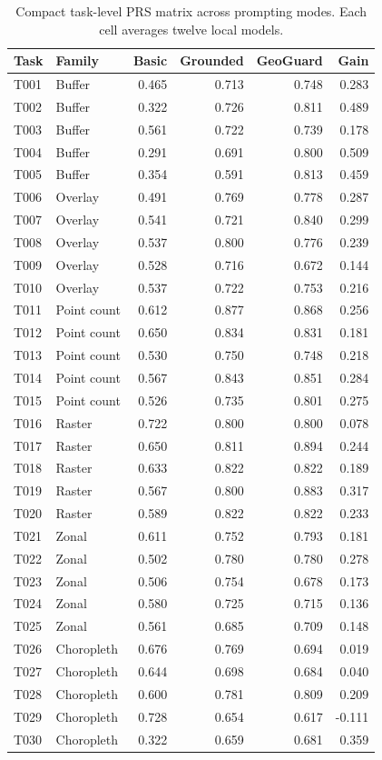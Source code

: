 \begin{table}[H]
\centering
\caption{Compact task-level PRS matrix across prompting modes. Each cell averages twelve local models.}
\label{tab:task-prs-matrix}
\small
\setlength{\tabcolsep}{4pt}
\begin{tabular}{llrrrr}
\toprule
Task & Family & Basic & Grounded & GeoGuard & Gain \\
\midrule
T001 & Buffer & 0.465 & 0.713 & 0.748 & 0.283 \\
T002 & Buffer & 0.322 & 0.726 & 0.811 & 0.489 \\
T003 & Buffer & 0.561 & 0.722 & 0.739 & 0.178 \\
T004 & Buffer & 0.291 & 0.691 & 0.800 & 0.509 \\
T005 & Buffer & 0.354 & 0.591 & 0.813 & 0.459 \\
T006 & Overlay & 0.491 & 0.769 & 0.778 & 0.287 \\
T007 & Overlay & 0.541 & 0.721 & 0.840 & 0.299 \\
T008 & Overlay & 0.537 & 0.800 & 0.776 & 0.239 \\
T009 & Overlay & 0.528 & 0.716 & 0.672 & 0.144 \\
T010 & Overlay & 0.537 & 0.722 & 0.753 & 0.216 \\
T011 & Point count & 0.612 & 0.877 & 0.868 & 0.256 \\
T012 & Point count & 0.650 & 0.834 & 0.831 & 0.181 \\
T013 & Point count & 0.530 & 0.750 & 0.748 & 0.218 \\
T014 & Point count & 0.567 & 0.843 & 0.851 & 0.284 \\
T015 & Point count & 0.526 & 0.735 & 0.801 & 0.275 \\
T016 & Raster & 0.722 & 0.800 & 0.800 & 0.078 \\
T017 & Raster & 0.650 & 0.811 & 0.894 & 0.244 \\
T018 & Raster & 0.633 & 0.822 & 0.822 & 0.189 \\
T019 & Raster & 0.567 & 0.800 & 0.883 & 0.317 \\
T020 & Raster & 0.589 & 0.822 & 0.822 & 0.233 \\
T021 & Zonal & 0.611 & 0.752 & 0.793 & 0.181 \\
T022 & Zonal & 0.502 & 0.780 & 0.780 & 0.278 \\
T023 & Zonal & 0.506 & 0.754 & 0.678 & 0.173 \\
T024 & Zonal & 0.580 & 0.725 & 0.715 & 0.136 \\
T025 & Zonal & 0.561 & 0.685 & 0.709 & 0.148 \\
T026 & Choropleth & 0.676 & 0.769 & 0.694 & 0.019 \\
T027 & Choropleth & 0.644 & 0.698 & 0.684 & 0.040 \\
T028 & Choropleth & 0.600 & 0.781 & 0.809 & 0.209 \\
T029 & Choropleth & 0.728 & 0.654 & 0.617 & -0.111 \\
T030 & Choropleth & 0.322 & 0.659 & 0.681 & 0.359 \\
\bottomrule
\end{tabular}
\end{table}
